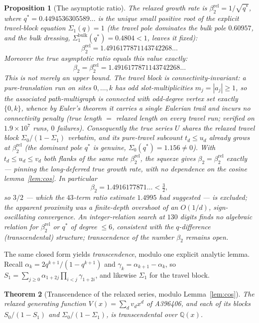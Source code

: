 \documentclass[11pt,a4paper]{article}
\newtheorem{theorem}{Theorem}
\newtheorem{proposition}[theorem]{Proposition}
\theoremstyle{remark}
\theoremstyle{plain}
\begin{document}
\begin{proposition}[The asymptotic ratio]
\label{prop:beta2}
The relaxed growth rate is $\beta_2^{\mathrm{rel}} = 1/\sqrt{q^*}$, where
$q^* = 0.4494536305589\ldots$ is the unique small positive root of the
explicit travel-block equation $\Sigma_1(q) = 1$ (the travel pole
dominates the bulk pole $0.60957$, and the bulk dressing,
$\Sigma_1^{\mathrm{bulk}}(q^*) = 0.4804 < 1$, leaves it fixed):
\[
\beta_2^{\mathrm{rel}} = 1.4916177871143742268\ldots
\]
Moreover the \emph{true} asymptotic ratio equals this value \emph{exactly}:
\[
\beta_2 = \beta_2^{\mathrm{rel}} = 1.4916177871143742268\ldots
\]
This is not merely an upper bound.  The travel block is
\emph{connectivity-invariant}: a pure-translation run on sites $0,\dots,k$
has odd slot-multiplicities $m_j = |a_j| \ge 1$, so the associated
path-multigraph is connected with odd-degree vertex set exactly $\{0,k\}$,
whence by Euler's theorem it carries a single Eulerian trail and incurs no
connectivity penalty (true length $=$ relaxed length on every travel run;
verified on $1.9\times10^7$ runs, $0$ failures).  Consequently the true
series $U$ shares the relaxed travel block $\Sigma_0/(1-\Sigma_1)$
\emph{verbatim}, and its pure-travel subcount $t_d \le u_d$ already grows at
$\beta_2^{\mathrm{rel}}$ (the dominant pole $q^*$ is genuine,
$\Sigma_0(q^*) = 1.156 \ne 0$).  With $t_d \le u_d \le v_d$ both flanks of
the same rate $\beta_2^{\mathrm{rel}}$, the squeeze gives
$\beta_2 = \beta_2^{\mathrm{rel}}$ exactly --- pinning the long-deferred true
growth rate, with no dependence on the cosine lemma~\eqref{lem:cos}.  In
particular
\[
\beta_2 = 1.4916177871\ldots < \tfrac{3}{2},
\]
so $3/2$ --- which the $43$-term ratio estimate $1.4995$ had suggested ---
is \emph{excluded}; the apparent proximity was a finite-depth overshoot of
an $O(1/d)$, sign-oscillating convergence.  An integer-relation search at
$130$ digits finds no algebraic relation for $\beta_2^{\mathrm{rel}}$ or
$q^*$ of degree $\le 6$, consistent with the $q$-difference (transcendental)
structure; transcendence of the \emph{number} $\beta_2$ remains open.
\end{proposition}

The same closed form yields \emph{transcendence}, modulo one explicit
analytic lemma.  Recall $\alpha_k = 2q^{k+1}/(1-q^{k+1})$ and
$\gamma_k = \alpha_{k+1} - \alpha_k$, so $S_1 = \sum_{j\ge0} \alpha_{1+2j}
\prod_{i<j}\gamma_{1+2i}$, and likewise $\Sigma_1$ for the travel block.

\begin{theorem}[Transcendence of the relaxed series, modulo
Lemma~\ref{lem:cos}]
\label{thm:transcendence}
The relaxed generating function $V(x) = \sum_d v_d x^d$ of A396406, and
each of its blocks $S_0/(1-S_1)$ and $\Sigma_0/(1-\Sigma_1)$, is
transcendental over $\mathbb{Q}(x)$.
\end{theorem}
\end{document}
